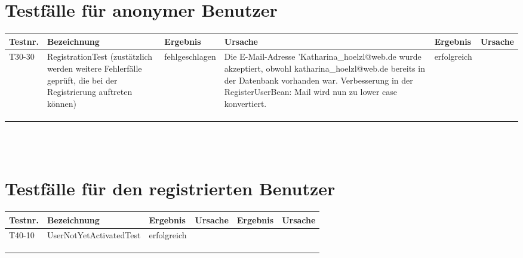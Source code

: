 \begin{landscape}
	\section{Testfälle für anonymer Benutzer}
		\begin{tabular}{|p{2.0cm} |p{5.0cm}|p{3.0cm}|p{5.0cm}|p{4.0cm}|p{4.0cm}|}
			\hline \textbf{Testnr.} & \textbf{Bezeichnung} & \textbf{Ergebnis} & \textbf{Ursache} & \textbf{Ergebnis} & \textbf{Ursache} \\
			\hline   T30-30    & RegistrationTest (zustätzlich werden weitere Fehlerfälle geprüft, die bei der Registrierung auftreten können)   &   fehlgeschlagen       &    Die E-Mail-Adresse 'Katharina\_hoelzl@web.de wurde akzeptiert, obwohl katharina\_hoelzl@web.de bereits in der Datenbank vorhanden war. Verbesserung in der RegisterUserBean: Mail wird nun zu lower case konvertiert.    &    erfolgreich     &       \\
			\hline       &          &          &        &         &       \\
			\hline       &          &          &        &         &       \\
			\hline       &          &          &        &         &       \\
			\hline 
		\end{tabular} \ \\
		\ \\
			
	\section{Testfälle für den registrierten Benutzer}
		\begin{tabular}{|p{2.0cm} |p{5.0cm}|p{3.0cm}|p{5.0cm}|p{4.0cm}|p{4.0cm}|}
			\hline \textbf{Testnr.} & \textbf{Bezeichnung} & \textbf{Ergebnis} & \textbf{Ursache} & \textbf{Ergebnis} & \textbf{Ursache} \\
			\hline T40-10   &  UserNotYetActivatedTest        & erfolgreich   &        &         &       \\
			\hline       &          &          &        &         &       \\
			\hline       &          &          &        &         &       \\
			\hline       &          &          &        &         &       \\
			\hline 
		\end{tabular} \ \\
		\ \\
			

\end{landscape}

